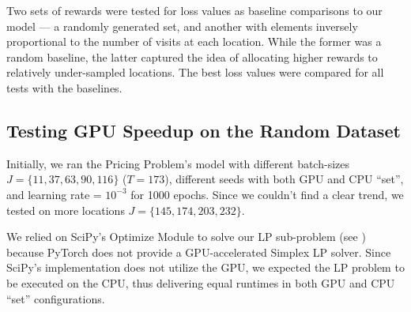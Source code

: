 Two sets of rewards were tested for loss values as baseline comparisons to our model --- a randomly generated set, and another with elements inversely proportional to the number of visits at each location. While the former was a random baseline, the latter captured the idea of allocating higher rewards to relatively under-sampled locations. The best loss values were compared for all tests with the baselines.

\subsection{Testing GPU Speedup on the Random Dataset} \label{sec:Pricing Problem-Testing GPU Speedup on the Random Dataset}
Initially, we ran the Pricing Problem's model with different batch-sizes $J = \{11, 37, 63, 90, 116\}$ ($T = 173$), different seeds with both GPU and CPU ``set'', and learning rate = $10^{-3}$ for 1000 epochs. Since we couldn't find a clear trend, we tested on more locations $J = \{145, 174, 203, 232\}$.

We relied on SciPy's Optimize Module to solve our LP sub-problem (see ) because PyTorch does not provide a GPU-accelerated Simplex LP solver. Since SciPy's implementation does not utilize the GPU, we expected the LP problem to be executed on the CPU, thus delivering equal runtimes in both GPU and CPU ``set'' configurations.